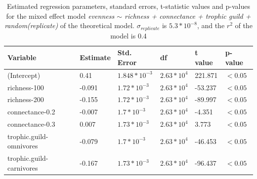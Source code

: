 \clearpage
\begin{landscape}
\begin{table}[ht!]
\centering
\caption[Coefficients from evenness regression in simulated networks]{\color{Gray}Estimated regression parameters, standard errors, t-statistic values and p-values for the mixed effect model \textit{evenness $\sim$ richness + connectance + trophic guild + random(replicate)} of the theoretical model. $\sigma_{replicate}$ is $5.3*10^{-8}$, and the $r^2$ of the model is 0.4}\label{tab:tab4.1}
\begin{tabular}{llllll}
\hline
Variable & Estimate & Std. Error &         df & t value & p-value \\
\hline
(Intercept)            &  0.41 & $1.848*10^{-3}$ & $2.63*10^{4}$ & 221.871 & $<0.05$ \\
richness-100      & -0.091 & $1.72*10^{-3}$ &  $2.63*10^{4}$ & -53.237 & $<0.05$ \\
richness-200      & -0.155 & $1.72*10^{-3}$ &  $2.63*10^{4}$ & -89.997 & $<0.05$ \\
connectance-0.2   & -0.007 & $1.7*10^{-3}$ &  $2.63*10^{4}$ & -4.351 & $<0.05$ \\
connectance-0.3   &  0.007 & $1.73*10^{-3}$ &  $2.63*10^{4}$ & 3.773 & $<0.05$ \\
trophic.guild-omnivores & -0.079 & $1.7*10^{-3}$ & $2.63*10^{4}$ & -46.453 & $<0.05$ \\
trophic.guild-carnivores & -0.167 & $1.73*10^{-3}$ & $2.63*10^{4}$ & -96.437 & $<0.05$ \\
\hline
\end{tabular}

\end{table}


\end{landscape}
